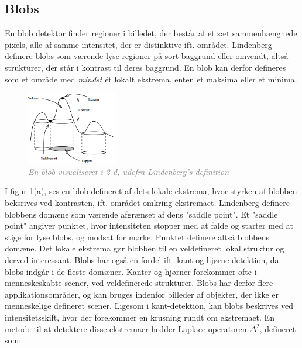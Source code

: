 \subsection{Blobs}
En blob detektor finder regioner i billedet, der består af et sæt sammenhængnede pixels, alle af samme intensitet, der er distinktive ift. området. Lindenberg \cite{blob} definere blobs som værende lyse regioner på sort baggrund eller omvendt, altså strukturer, der står i kontrast til deres baggrund. En blob kan derfor defineres som et område med \emph{mindst} ét lokalt ekstrema, enten et maksima eller et minima.
\begin{figure}[H]
    \centering
    \includegraphics[width=0.35\textwidth]{fig/11.png}
    \vspace{-0.5em}   
    \begin{center}
    \caption{\textcolor{gray}{\footnotesize \textit{
    En blob visualiseret i 2-d, udefra Lindenberg's definition \cite{blob}}}}
    \label{fig:lindblob}
     \end{center}
  \end{figure}
       \vspace{-2.7em}
\noindent
I figur \ref{fig:lindblob}(a), ses en blob defineret af dets lokale ekstrema, hvor styrken af blobben beksrives ved kontrasten, ift. området omkring ekstremaet. Lindenberg definere blobbens domæne som værende afgrænset af dens "saddle point". Et "saddle point" angiver punktet, hvor intensiteten stopper med at falde og starter med at stige for lyse blobs, og modsat for mørke. Punktet definere altså blobbens domæne. Det lokale ekstrema gør blobben til en veldefineret lokal struktur og derved interessant. Blobs har også en fordel ift. kant og hjørne detektion, da blobs indgår i de fleste domæner. Kanter og hjørner forekommer ofte i menneskeskabte scener, ved veldefinerede strukturer. Blobs har derfor flere applikationsområder, og kan bruges indenfor billeder af objekter, der ikke er menneskelige defineret scener.  Ligesom i kant-detektion, kan blobs beskrives ved intensitetsskift, hvor der forekommer en krusning rundt om ekstremaet. En metode til at detektere disse ekstremaer hedder Laplace operatoren $\Delta^2$, defineret som:
